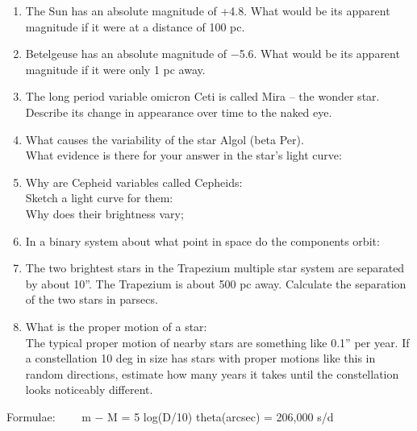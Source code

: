 \documentclass[11pt]{article}
\begin{document}
\begin{enumerate}
\item 
The Sun has an absolute magnitude of +4.8. What would be its apparent
magnitude if it were at a distance of 100 pc.

\item 
Betelgeuse has an absolute magnitude of $-$5.6. What would be its
apparent magnitude if it were only 1 pc away.

\item 
The long period variable omicron Ceti is called Mira -- the wonder
star. Describe its change in appearance over time to the naked eye.

\item 
What causes the variability of the star Algol (beta Per). \\
What evidence is there for your answer in the star's light curve:


\item 
Why are Cepheid variables called Cepheids: \\
Sketch a light curve for them: \\
Why does their brightness vary;

\item 
In a binary system about what point in space do the components orbit:

\item 
The two brightest stars in the Trapezium multiple star system are
separated by about 10''. The Trapezium is about 500 pc
away. Calculate the separation of the two stars in parsecs.

\item 
What is the proper motion of a star: \\
The typical proper motion of nearby stars are something like
0.1'' per year. If a constellation 10 deg in size has stars with proper
motions like this in random directions, estimate how many years it
takes until the constellation looks noticeably different.

\end{enumerate} 

Formulae: \ \ \ \ m $-$ M = 5 log(D/10) \hspace{2cm} theta(arcsec) = 206,000 s/d
\end{document}
